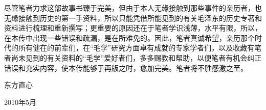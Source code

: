 \documentclass[../../dazhuan.tex]{subfiles}
\begin{document}
尽管笔者力求这部故事书臻于完美，但由于本人无缘接触到那些事件的亲历者，也无缘接触到历史的第一手资料，所以只能凭借所能见到的有关毛泽东的历史专著和资料进行梳理和重新撰写；更重要的原因还在于笔者学识浅薄，水平有限，所以，在本传中出现一些错误和疏漏，是在所难免的。因此，笔者真诚希望，亲历那个时代的所有健在的前辈们，在“毛学”研究方面卓有成就的专家学者们，以及收藏有笔者尚未见到的有关资料的“毛学”爱好者们，多多赐教和帮助，以便笔者有机会纠正错误和充实内容，使本传能够于再版之时，愈加完美。笔者将不胜感激之至。

\begin{sign}
东方直心

2010年5月
\end{sign}
    
\end{document}
